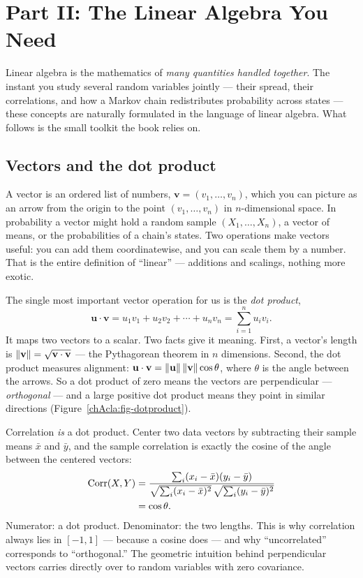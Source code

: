 \section{Part II: The Linear Algebra You Need}
\label{chAcla:la-intro}

Linear algebra is the mathematics of \emph{many quantities handled together}. The instant you study several random variables jointly --- their
spread, their correlations, and how a Markov chain redistributes probability across states --- these
concepts are naturally formulated in the language of linear algebra. What follows is the small toolkit
the book relies on.

\subsection{Vectors and the dot product}
\label{chAcla:vectors}

A vector is an ordered list of numbers, $\mathbf{v}=(v_1,\dots,v_n)$, which you can picture as an
arrow from the origin to the point $(v_1,\dots,v_n)$ in $n$-dimensional space. In probability a vector
might hold a random sample $(X_1,\dots,X_n)$, a vector of means, or the probabilities of a chain's
states. Two operations make vectors useful: you can add them coordinatewise, and you can scale them by
a number. That is the entire definition of ``linear'' --- additions and scalings, nothing more exotic.

The single most important vector operation for us is the \emph{dot product},
\[
  \mathbf{u}\cdot\mathbf{v} = u_1 v_1 + u_2 v_2 + \cdots + u_n v_n = \sum_{i=1}^n u_i v_i.
\]
It maps two vectors to a scalar. Two facts give it meaning. First, a vector's length is
$\lVert\mathbf{v}\rVert = \sqrt{\mathbf{v}\cdot\mathbf{v}}$ --- the Pythagorean theorem in $n$ dimensions.
Second, the dot product measures alignment: $\mathbf{u}\cdot\mathbf{v} =
\lVert\mathbf{u}\rVert\,\lVert\mathbf{v}\rVert\cos\theta$, where $\theta$ is the angle between the arrows. So a
dot product of zero means the vectors are perpendicular --- \emph{orthogonal} --- and a large positive
dot product means they point in similar directions (Figure~\ref{chAcla:fig-dotproduct}).

\begin{happeningbox}
Correlation \emph{is} a dot product. Center two data vectors by subtracting their sample means $\bar x$ and $\bar y$, and the
sample correlation is exactly the cosine of the angle between the centered vectors:
\begin{align*}
  \operatorname{Corr}(X,Y) &= \frac{\sum_i (x_i-\bar x)(y_i-\bar y)}
                    {\sqrt{\sum_i (x_i-\bar x)^2}\,\sqrt{\sum_i (y_i-\bar y)^2}} \\
            &= \cos\theta.
\end{align*}
Numerator: a dot product. Denominator: the two lengths. This is why correlation always lies in
$[-1,1]$ --- because a cosine does --- and why ``uncorrelated'' corresponds to
``orthogonal.'' The geometric intuition behind perpendicular vectors carries
directly over to random variables with zero covariance.
\end{happeningbox}

